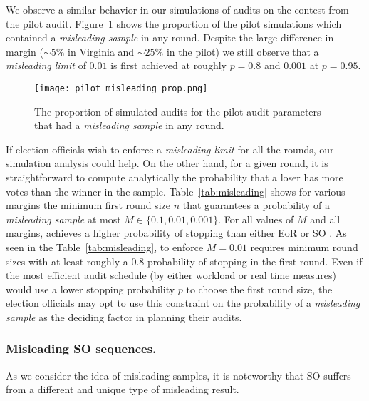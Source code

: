 We observe a similar behavior in our simulations of audits on the contest from the pilot audit. Figure~\ref{fig:pilot_misleading} shows the proportion of the pilot simulations which contained a \emph{misleading sample} in any round. Despite the large difference in margin ($\sim 5\%$ in Virginia and $\sim 25\%$ in the pilot) we still observe that a \emph{misleading limit} of $0.01$ is first achieved at roughly $p=0.8$ and $0.001$ at $p=0.95$.

\begin{figure}
\texttt{[image: pilot\_misleading\_prop.png]}
\caption{The proportion of simulated \Providence audits for the pilot audit parameters that had a \emph{misleading sample} in any round.}
\label{fig:pilot_misleading}
\end{figure}

If election officials wish to enforce a \emph{misleading limit} for all the rounds, our simulation analysis could help. On the other hand, for a given round, it is straightforward to compute analytically the probability that a loser has more votes than the winner in the sample. Table~\ref{tab:misleading} shows for various margins the minimum first round size $n$ that guarantees a probability of a \emph{misleading sample} at most $M\in\{0.1,0.01,0.001\}$. For all values of $M$ and all margins, \Providence achieves a higher probability of stopping than either EoR \BRAVO or SO \BRAVO. 
    As seen in the Table~\ref{tab:misleading}, to enforce $M=0.01$ requires minimum round sizes with at least roughly a $0.8$ probability of stopping in the first round. Even if the most efficient audit schedule (by either workload or real time measures) would use a lower stopping probability $p$ to choose the first round size, the election officials may opt to use this constraint on the probability of a \emph{misleading sample} as the deciding factor in planning their audits.

\subsubsection{Misleading SO \BRAVO sequences.} As we consider the idea of misleading samples, it is noteworthy that SO \BRAVO suffers from a different and unique type of misleading result. 

